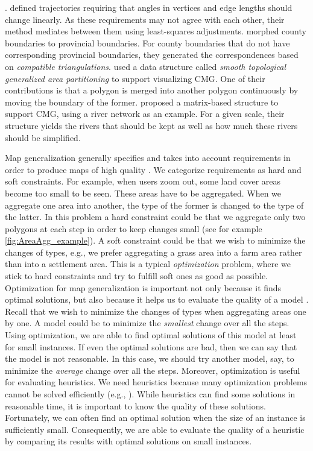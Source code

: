 \documentclass[acmsmall,natbib=false]{acmart}
\begin{document}
\parencite{Chazal2010BallMap}.
\textcite{Peng2013LSA} defined trajectories requiring that
angles in vertices and edge lengths should change linearly.
As these requirements may not agree with each other,
their method mediates between them using 
least-squares adjustments.
\textcite{Peng2016Admin} morphed county boundaries
to provincial boundaries.
For county boundaries that do not have corresponding 
provincial boundaries, they generated the correspondences based 
on \emph{compatible triangulations}.
\Textcite{vanOosterom2014tGAP} used
a data structure called
\emph{smooth topological generalized area partitioning}
to support visualizing CMG.
One of their contributions is that
a polygon is merged into another polygon continuously
by moving the boundary of the former.
\textcite{Huang2017Matrix} proposed a matrix-based structure 
to support CMG,
using a river network as an example.
For a given scale, 
their structure yields the rivers that should be kept 
as well as how much these rivers should be simplified.



Map generalization generally specifies 
and takes into account requirements
in order to produce maps of high quality
\parencite{Stoter2009Requirements}.
We categorize requirements as hard and soft constraints.
For example, when users zoom out, 
some land cover areas become too small to be seen.
These areas have to be aggregated.
When we aggregate one area into another, 
the type of the former is changed to the type of the latter. 
In this problem a hard constraint could be that 
we aggregate only two polygons at each step 
in order to keep changes small
(see for example \fig\ref{fig:AreaAgg_example}). 
A soft constraint could be that 
we wish to minimize the changes of types, e.g., 
we prefer aggregating a grass area into a farm area 
rather than into a settlement area.
This is a typical \emph{optimization} problem,
where we stick to hard constraints and 
try to fulfill soft ones as good as possible.
Optimization for map generalization is important 
not only because it finds optimal solutions,
but also because it helps us to evaluate the quality of a model
\parencite{Haunert2017Label,Haunert2008Assuring,Haunert2016Optimization}.
Recall that we wish to minimize the changes of types
when aggregating areas one by one.
A model could be to minimize 
the \emph{smallest} change over all the steps.
Using optimization, we are able to find optimal solutions
of this model at least for small instances.
If even the optimal solutions are bad,
then we can say that the model is not reasonable.
In this case, we should try another model, say, 
to minimize the \emph{average} change over all the steps.
Moreover, optimization is useful for evaluating heuristics.
We need heuristics because
many optimization problems cannot be solved efficiently
(e.g., \citealp{HaunertWolff2010AreaAgg,Haunert2016Partition}).
While heuristics can find some solutions in reasonable time,
it is important to know the quality of 
these solutions.
Fortunately, we can often find an optimal solution when 
the size of an instance is sufficiently small.
Consequently, we are able to evaluate 
the quality of a heuristic 
by comparing its results with optimal solutions
on small instances.
\end{document}
